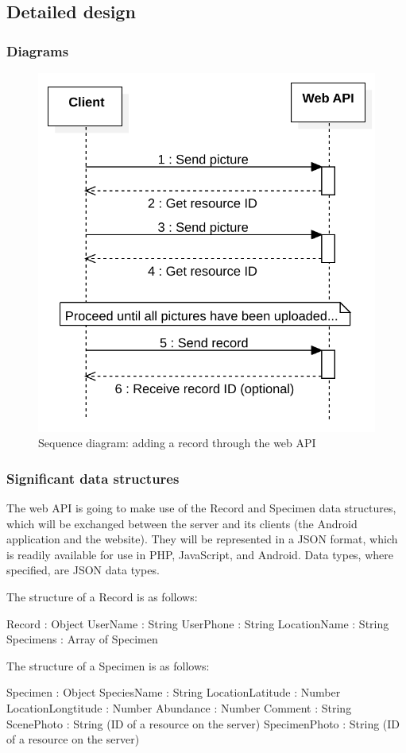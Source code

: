 \subsection{Detailed design}
\subsubsection{Diagrams}
\begin{figure}
\centering
\includegraphics[scale=0.75]{server/SequenceDiagram-AddRecord.svg}
\caption{Sequence diagram: adding a record through the web API}
\label{fig:addRecordSequenceDiagram}
\end{figure}
\subsubsection{Significant data structures}

The web API is going to make use of the Record and Specimen data structures,
which will be exchanged between the server and its clients (the Android
application and the website). They will be represented in a JSON format, which 
is readily available for use in PHP, JavaScript, and Android. Data types, where
specified, are JSON data types.

The structure of a Record is as follows:

Record : Object
    UserName : String
    UserPhone : String
    LocationName : String 
    Specimens : Array of Specimen
    
The structure of a Specimen is as follows:
    
Specimen : Object
    SpeciesName : String
    LocationLatitude : Number
    LocationLongtitude : Number
    Abundance : Number
    Comment : String
    ScenePhoto : String (ID of a resource on the server)
    SpecimenPhoto : String (ID of a resource on the server)